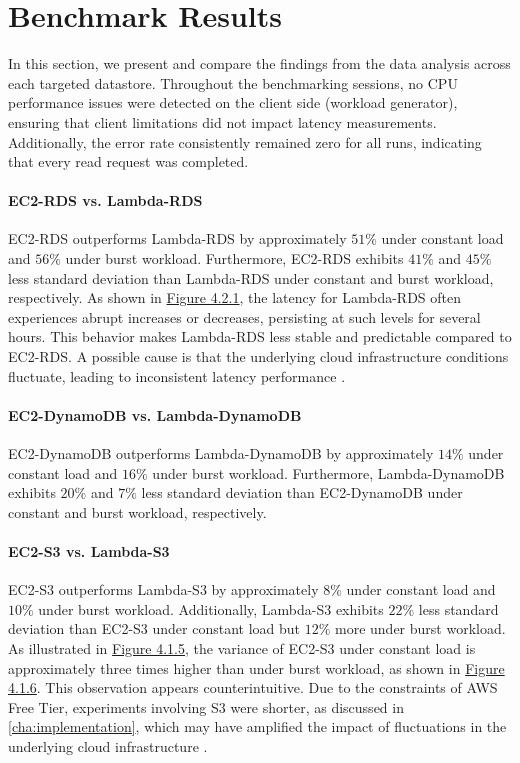 \section{Benchmark Results}
\label{cha:results}

In this section, we present and compare the findings from the data analysis across each targeted datastore. Throughout the benchmarking sessions, no CPU performance issues were detected on the client side (workload generator), ensuring that client limitations did not impact latency measurements. Additionally, the error rate consistently remained zero for all runs, indicating that every read request was completed.

\paragraph*{EC2-RDS vs. Lambda-RDS}
EC2-RDS outperforms Lambda-RDS by approximately $51\%$ under constant load and $56\%$ under burst workload. Furthermore, EC2-RDS exhibits $41\%$ and $45\%$ less standard deviation than Lambda-RDS under constant and burst workload, respectively. As shown in \hyperref[fig]{Figure 4.2.1}, the latency for Lambda-RDS often experiences abrupt increases or decreases, persisting at such levels for several hours. This behavior makes Lambda-RDS less stable and predictable compared to EC2-RDS. A possible cause is that the underlying cloud infrastructure conditions fluctuate, leading to inconsistent latency performance \cite{}.

\paragraph*{EC2-DynamoDB vs. Lambda-DynamoDB} EC2-DynamoDB outperforms Lambda-DynamoDB by approximately $14\%$ under constant load and $16\%$ under burst workload. Furthermore, Lambda-DynamoDB exhibits $20\%$ and $7\%$ less standard deviation than EC2-DynamoDB under constant and burst workload, respectively.

\paragraph*{EC2-S3 vs. Lambda-S3}
EC2-S3 outperforms Lambda-S3 by approximately $8\%$ under constant load and $10\%$ under burst workload. Additionally, Lambda-S3 exhibits $22\%$ less standard deviation than EC2-S3 under constant load but $12\%$ more under burst workload. As illustrated in \hyperref[fig:bar_s3_const]{Figure 4.1.5}, the variance of EC2-S3 under constant load is approximately three times higher than under burst workload, as shown in \hyperref[fig:bar_s3_bursty]{Figure 4.1.6}. This observation appears counterintuitive. Due to the constraints of AWS Free Tier, experiments involving S3 were shorter, as discussed in \cref{cha:implementation}, which may have amplified the impact of fluctuations in the underlying cloud infrastructure \cite{}.

